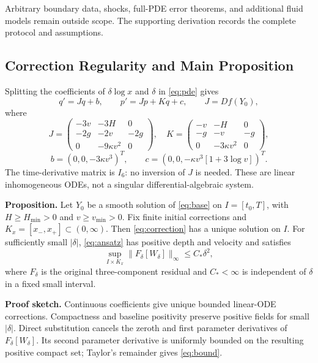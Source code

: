 \documentclass[12pt,a4paper]{article}
\begin{document}
Arbitrary boundary data, shocks, full-PDE error theorems, and additional fluid models remain outside scope. The supporting derivation records the complete protocol and assumptions.

\newpage
\subsection{Correction Regularity and Main Proposition}
Splitting the coefficients of $\delta\log x$ and $\delta$ in \eqref{eq:pde} gives
\begin{equation}
q'=Jq+b,\qquad p'=Jp+Kq+c,\qquad J=Df(Y_0),
\label{eq:correction}
\end{equation}
where
\[
J=\begin{pmatrix}-3v&-3H&0\\-2g&-2v&-2g\\0&-9\kappa v^2&0\end{pmatrix},\quad
K=\begin{pmatrix}-v&-H&0\\-g&-v&-g\\0&-3\kappa v^2&0\end{pmatrix},
\]
\[
b=(0,0,-3\kappa v^3)^T,\qquad
c=(0,0,-\kappa v^3[1+3\log v])^T.
\]
The time-derivative matrix is $I_6$: no inversion of $J$ is needed. These are linear inhomogeneous ODEs, not a singular differential-algebraic system.

\textbf{Proposition.} Let $Y_0$ be a smooth solution of \eqref{eq:base} on $I=[t_0,T]$, with $H\ge H_{\min}>0$ and $v\ge v_{\min}>0$. Fix finite initial corrections and $K_x=[x_-,x_+]\subset(0,\infty)$. Then \eqref{eq:correction} has a unique solution on $I$. For sufficiently small $|\delta|$, \eqref{eq:ansatz} has positive depth and velocity and satisfies
\begin{equation}
\sup_{I\times K_x}\|F_\delta[W_\delta]\|_\infty\le C_*\delta^2,
\label{eq:bound}
\end{equation}
where $F_\delta$ is the original three-component residual and $C_*<\infty$ is independent of $\delta$ in a fixed small interval.

\textbf{Proof sketch.} Continuous coefficients give unique bounded linear-ODE corrections. Compactness and baseline positivity preserve positive fields for small $|\delta|$. Direct substitution cancels the zeroth and first parameter derivatives of $F_\delta[W_\delta]$. Its second parameter derivative is uniformly bounded on the resulting positive compact set; Taylor's remainder gives \eqref{eq:bound}.
\end{document}
